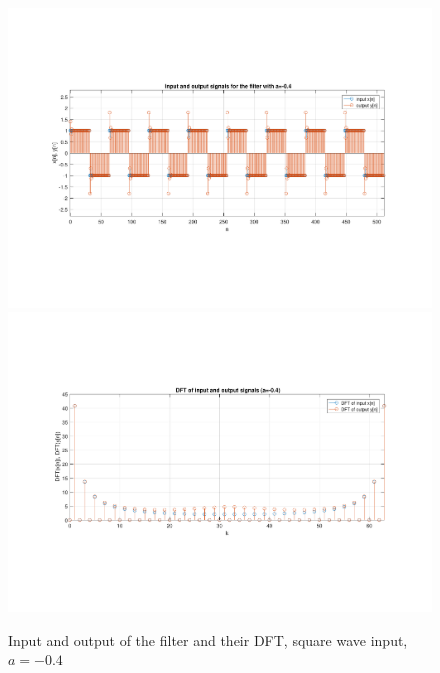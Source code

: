 \begin{figure} [H]
	\centering
	\includegraphics[trim={2.5cm 5cm 2.5cm 5cm}, clip, width=0.75\linewidth]{io_sw_3}
	\includegraphics[trim={2.5cm 5cm 2.5cm 5cm}, clip, width=0.75\linewidth]{dft_sw_3}
	\caption{Input and output of the filter and their DFT, square wave input, $a=-0.4$}
	\label{fig:t1_io_sw_3}
\end{figure}
